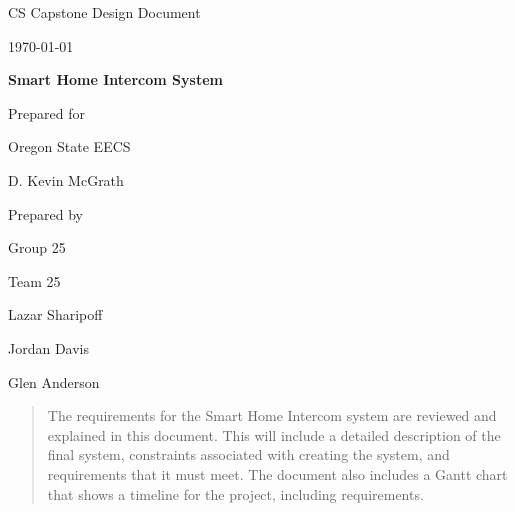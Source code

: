 \documentclass[onecolumn, draftclsnofoot,10pt, compsoc]{IEEEtran}
\def \CapstoneTeamName{		Team 25}
\def \CapstoneTeamNumber{		25}
\def \GroupMemberOne{			Lazar Sharipoff}
\def \GroupMemberTwo{			Jordan Davis}
\def \GroupMemberThree{			Glen Anderson}
\def \CapstoneProjectName{		Smart Home Intercom System}
\def \CapstoneSponsorCompany{	Oregon State EECS}
\def \CapstoneSponsorPerson{		D. Kevin McGrath}
\def \DocType{		%
				Design Document
				}
\newcommand{\NameSigPair}[1]{\par
\makebox[2.75in][r]{#1} \hfil 	\makebox[3.25in]{\makebox[2.25in]{\hrulefill} \hfill		\makebox[.75in]{\hrulefill}}
\par\vspace{-12pt} \textit{\tiny\noindent
\makebox[2.75in]{} \hfil		\makebox[3.25in]{\makebox[2.25in][r]{Signature} \hfill	\makebox[.75in][r]{Date}}}}
\renewcommand{\NameSigPair}[1]{#1}
\begin{document}
\begin{titlepage}
    \begin{singlespace}
        \hfill 
        \par\vspace{.2in}
        \centering
        \scshape{
            \huge CS Capstone \DocType \par
            {\large\today}\par
            \vspace{.5in}
            \textbf{\Huge\CapstoneProjectName}\par
            \vfill
            {\large Prepared for}\par
            \Huge \CapstoneSponsorCompany\par
            \vspace{5pt}
            {\Large\NameSigPair{\CapstoneSponsorPerson}\par}
            {\large Prepared by }\par
            Group\CapstoneTeamNumber\par
            \CapstoneTeamName\par 
            \vspace{5pt}
            {\Large
                \NameSigPair{\GroupMemberOne}\par
                \NameSigPair{\GroupMemberTwo}\par
                \NameSigPair{\GroupMemberThree}\par
            }
            \vspace{20pt}
        }
        \begin{abstract}
        	The requirements for the Smart Home Intercom system are reviewed and explained in this document. This will include a detailed description of the final system, constraints associated with creating the system, and requirements that it must meet. The document also includes a Gantt chart that shows a timeline for the project, including requirements.  
        \end{abstract}     
    \end{singlespace}
\end{titlepage}
\newpage
{}
\tableofcontents
\clearpage
\end{document}
